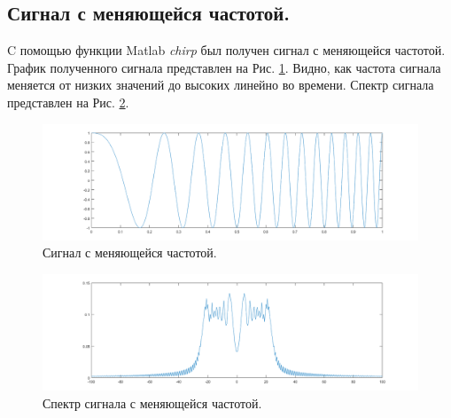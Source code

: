 \documentclass[a4paper,14pt]{extarticle}
\begin{document}
\subsection{Сигнал с меняющейся частотой.}
C помощью функции Matlab \textit{chirp} был получен сигнал с меняющейся частотой. График полученного сигнала представлен на Рис. \ref{chirp}. Видно, как частота  сигнала меняется от низких значений до высоких линейно во времени. Спектр сигнала представлен на Рис. \ref{chirp_}.
\begin{figure}[H]
\centering
\includegraphics[scale=0.5]{pics/chirp.png}
\caption{Сигнал с меняющейся частотой.}
\label{chirp}
\end{figure}
\begin{figure}[H]
\centering
\includegraphics[scale=0.5]{pics/chirp_spec.png}
\caption{Спектр сигнала с меняющейся частотой.}
\label{chirp_}
\end{figure}
\end{document}
